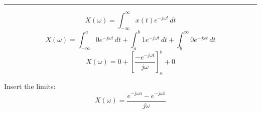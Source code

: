 \rule{\textwidth}{0.5pt}
$$X(\omega)=\int_{-\infty}^{\infty}x(t)e^{ -j\omega t }  \, dt $$
$$X(\omega)=\int_{-\infty}^{a}0e^{ -j\omega t }  \, dt +\int_{a}^{b}1e^{ -j\omega t }  \, dt +\int_{b}^{\infty}0e^{ -j\omega t }  \, dt $$
$$X(\omega)=0+\left[\frac{-e^{-j\omega t}}{j\omega} \right]_a^b+0$$

Insert the limits:
$$X(\omega)=\frac{e^{-j\omega a}-e^{-j\omega b}}{j\omega}$$
%
%
